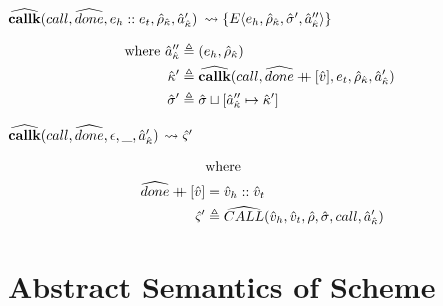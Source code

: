 \documentclass[12pt,draft]{article}
\newcommand\mdoubleplus{\ensuremath{\mathbin{+\mkern-9mu+}}}
\newcommand{\E}[4]{E\langle #1 , #2 , #3 , #4 \rangle}
\begin{document}
\begin{multicols*}{2}
  \begin{center}
    $\widehat{\textbf{callk}}(call , \widehat{done} , e_h :: e_t , \hat{\rho}_{\hat{\kappa}} , \hat{a}_{\hat{\kappa}}')$
    $\leadsto \{ \E{e_h}{\aenv_{\akont}}{\astore'}{\akaddr''} \}$
  \end{center}
  \vspace{-7mm}
  \begin{align*}
    \text{where }
    \akaddr'' &\triangleq (e_h , \aenv_{\akont}) \\
    \akont' &\triangleq \acallk{call}{\adone \mdoubleplus [\aval]}{e_t}{\aenv_{\akont}}{\akaddr'} \\
    \astore' &\triangleq \astore \sqcup [\akaddr'' \mapsto \akont']
  \end{align*}
  \begin{center}
    $\widehat{\textbf{callk}}(call , \widehat{done} , \epsilon , \_ , \hat{a}_{\hat{\kappa}}')$
    $\leadsto \hat{\varsigma}'$
  \end{center}
  \vspace{-7mm}
  \begin{align*}
    &\text{where} \\\
    \adone \mdoubleplus [\aval] &= \aval_h :: \aval_t \\
    \astate' &\triangleq \aCALL(\aval_h , \aval_t , \aenv , \astore , call , \akaddr')
  \end{align*}
\end{multicols*}


\newcommand{\aballoc}[1]{\widehat{balloc}(#1)}
\newcommand{\akalloc}[1]{\widehat{kalloc}(#1)}
\newcommand{\ectrl}[0]{e_{\hat{\varsigma}}}
\newcommand{\actrladdr}[0]{\hat{a}_{\kappa\varsigma}}
\newcommand{\actrlkont}[0]{\kappa_{\varsigma}}

\newpage
\section{Abstract Semantics of Scheme}
\end{document}
